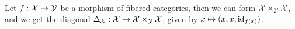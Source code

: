  \begin{example}
   Let $f:\mathcal{X}\to \mathcal{Y}$ be a morphism of fibered categories, then we can form $\mathcal{X}\times_{\mathcal{Y}}
   \mathcal{X}$, and we get the diagonal $\Delta_{\mathcal{X}}:\mathcal{X}\to \mathcal{X}\times_{\mathcal{Y}} \mathcal{X}$, given by $x\mapsto
   (x,x,\operatorname{id}_{f(x)})$.
 \end{example}

